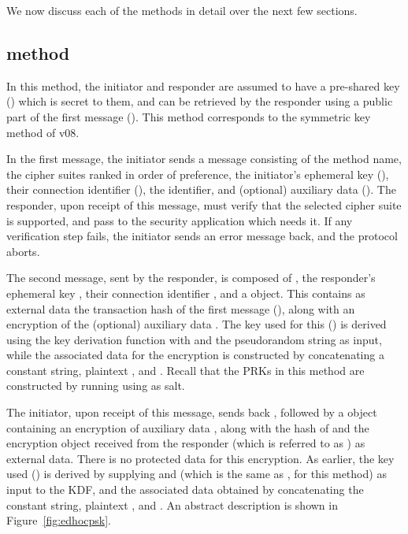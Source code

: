 We now discuss each of the \mEdhoc methods in detail over the next few sections.

\subsection{\mPskPsk method}
In this method, the initiator and responder are assumed to have a pre-shared key (\mPsk) which is secret to them, and can be retrieved by the responder using a public part of the first message (\mIDPsk). This method corresponds to the symmetric key method of \mEdhoc v08. 

In the first message, the initiator sends a message consisting of the method name, the cipher suites ranked in order of preference, the initiator's ephemeral key (\mGx), their connection identifier (\mCi), the \mIDPsk identifier, and (optional) auxiliary data (\mADone). The responder, upon receipt of this message, must verify that the selected cipher suite is supported,  and pass \mADone to the security application which needs it. If any verification step fails, the initiator sends an \mEdhoc error message back, and the protocol aborts.

The second message, sent by the responder, is composed of \mCi, the responder's ephemeral key \mGy, their connection identifier \mCr, and a \mCose object. This contains as external data the transaction hash of the first message (\mTHtwo), along with an \mAead encryption of the (optional) auxiliary data \mADtwo. The key used for this (\mKtwoae) is derived using the \mEdhoc key derivation function with \mTHtwo and the pseudorandom string \mPRKtwo as input, while the associated data for the \mAead encryption is constructed by concatenating a constant string, plaintext \mhplain, and \mTHtwo. Recall that the PRKs in this method are constructed by running \mHkdfExtract using \mPsk as salt. 

The initiator, upon receipt of this message, sends back \mCr, followed by a \mCose object containing an \mAead encryption of auxiliary data \mADthree, along with the hash of \mTHtwo and the encryption object received from the responder (which is referred to as \mTHthree) as external data. There is no protected data for this encryption. As earlier, the key used (\mKthreeae) is derived by supplying \mTHthree and \mPRKthree (which is the same as \mPRKtwo, for this method) as input to the KDF, and the associated data obtained by concatenating the constant string, plaintext \mhplain, and \mTHthree. An abstract description is shown in Figure~\ref{fig:edhocpsk}.

